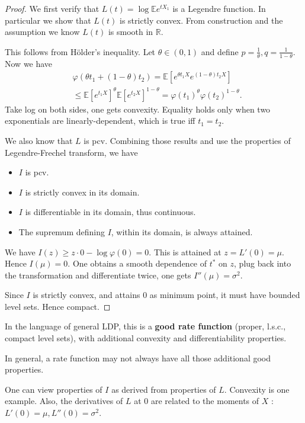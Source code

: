\begin{proof}
We first verify that $L(t) =\log \mathbb{E}e^{t X_1}$ is a Legendre function. In particular we show that $L(t)$ is strictly convex. From construction and the assumption we know $L(t)$ is smooth in $\mathbb{R}$.

This follows from Hölder's inequality. Let  $\theta \in (0,1)$ and define $p = \frac{1}{\theta}, q = \frac{1}{1 - \theta}$. Now we have
\begin{align*}
	&\varphi\left( \theta t_1 + (1 - \theta) t_2 \right) 
	= \mathbb{E}\left[ e^{\theta t_1 X} e^{(1 - \theta) t_2 X} \right] \\
	&\le \mathbb{E}\left[ e^{t_1 X} \right] ^{\theta} \mathbb{E}\left[ e^{t_2 X} \right] ^{1 - \theta}
	= \varphi(t_1)^\theta \varphi(t_2)^{1 - \theta}
.\end{align*} 
Take log on both sides, one gets convexity. Equality holds only when two exponentials are linearly-dependent, which is true iff $t_1 = t_2$.

We also know that $L$ is pcv. Combining those results and use the properties of Legendre-Frechel transform, we have
\begin{itemize}
	\item $I$ is pcv.
	\item $I$ is strictly convex in its domain.
	\item $I$ is differentiable in its domain, thus continuous.
	\item The supremum defining $I$, within its domain, is always attained.
\end{itemize}
We have $I(z) \ge z \cdot  0 - \log  \varphi(0) = 0$. This is attained at $z = L'(0) = \mu$. Hence $I(\mu) = 0$. One obtains a smooth dependence of $t^*$ on $z$, plug back into the transformation and differentiate twice, one gets $I''(\mu) = \sigma^2$.

Since $I$ is strictly convex, and attains $0$ as minimum point, it must have bounded level sets. Hence compact.
\end{proof}

\begin{remark}
	In the language of general LDP, this is a \textbf{good rate function} (proper, l.s.c., compact level sets), with additional convexity and differentiability properties. 

	In general, a rate function may not always have all those additional good properties.

	One can view properties of $I$ as derived from properties of $L$. Convexity is one example. Also, the derivatives of $L$ at $0$ are related to the moments of $X$ : $L'(0) = \mu, L''(0) = \sigma^2$.
\end{remark}

